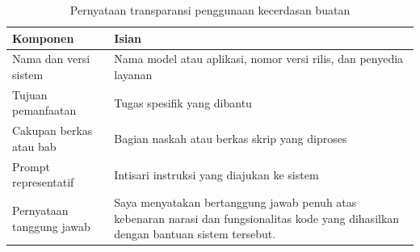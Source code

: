 

\begin{table}[htbp]
  \centering
  \caption{Pernyataan transparansi penggunaan kecerdasan buatan}
  \label{tab:transparansi-ai}
  \begin{tabularx}{\textwidth}{@{}>{\raggedright\arraybackslash}p{3.6cm}>{\raggedright\arraybackslash}X@{}}
    \toprule
    Komponen & Isian \\
    \midrule
    Nama dan versi sistem & Nama model atau aplikasi, nomor versi rilis, dan penyedia layanan \\
    Tujuan pemanfaatan & Tugas spesifik yang dibantu \\
    Cakupan berkas atau bab & Bagian naskah atau berkas skrip yang diproses \\
    Prompt representatif & Intisari instruksi yang diajukan ke sistem \\
    Pernyataan tanggung jawab & Saya menyatakan bertanggung jawab penuh atas kebenaran narasi dan fungsionalitas kode yang dihasilkan dengan bantuan sistem tersebut. \\
    \bottomrule
  \end{tabularx}
\end{table}
